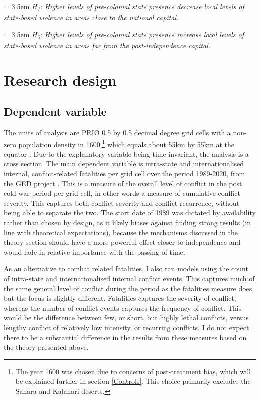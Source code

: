 \bigskip
\hangindent = 3.5em \textit{H\textsubscript{1}: Higher levels of pre-colonial
	state presence decrease local levels of state-based violence in areas
	close to the national capital.}

\bigskip
\hangindent = 3.5em \textit{H\textsubscript{2}: Higher levels of pre-colonial
	state presence increase local levels of state-based violence in areas
	far from the post-independence capital.}

\section{Research design} \label{Research design}

\subsection{Dependent variable} \label{Dependent variable}

The units of analysis are PRIO 0.5 by 0.5 decimal degree grid cells with a
non-zero population density in 1600,\footnote{The year 1600 was chosen due to
	concerns of post-treatment bias, which will be explained further in
	section \ref{Controls}. This choice primarily excludes the Sahara and
Kalahari deserts.} which equals about 55km by 55km at the equator
\citep{Tollefsen2012}. Due to the explanatory variable being time-invariant, the
analysis is a cross section. The main dependent variable is intra-state and
internationalised internal, conflict-related fatalities per grid cell over the
period 1989-2020, from the GED project \citep{Sundberg2013}. This is a measure
of the overall level of conflict in the post cold war period per grid cell, in
other words a measure of cumulative conflict severity. This captures both
conflict severity and conflict recurrence, without being able to separate the
two. The start date of 1989 was dictated by availability rather than chosen by
design, as it likely biases against finding strong results (in line with
theoretical expectations), because the mechanisms discussed in the theory
section should have a more powerful effect closer to independence and would fade
in relative importance with the passing of time.

As an alternative to combat related fatalities, I also ran models using the
count of intra-state and internationalised internal conflict events. This
captures much of the same general level of conflict during the period as the
fatalities measure does, but the focus is slightly different. Fatalities
captures the severity of conflict, whereas the number of conflict events
captures the frequency of conflict. This would be the difference between few, or
short, but highly lethal conflicts, versus lengthy conflict of relatively low
intensity, or recurring conflicts. I do not expect there to be a substantial
difference in the results from these measures based on the theory presented
above.

